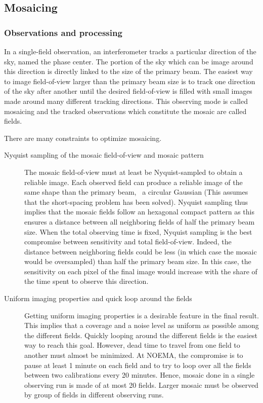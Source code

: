 \subsection{Mosaicing}
\label{sec:mosaicing}

\subsubsection{Observations and processing}

In a single-field observation, an interferometer tracks a particular
direction of the sky, named the phase center. The portion of the sky which
can be image around this direction is directly linked to the size of the
primary beam. The easiest way to image field-of-view larger than the
primary beam size is to track one direction of the sky after another until
the desired field-of-view is filled with small images made around many
different tracking directions. This observing mode is called mosaicing and
the tracked observations which constitute the mosaic are called fields.

There are many constraints to optimize mosaicing.
\begin{description}
\item[Nyquist sampling of the mosaic field-of-view and mosaic pattern] The
  mosaic field-of-view must at least be Nyquist-sampled to obtain a
  reliable image. Each observed field can produce a reliable image of the
  same shape than the primary beam, \ie\ a circular Gaussian (This assumes
  that the short-spacing problem has been solved). Nyquist sampling thus
  implies that the mosaic fields follow an hexagonal compact pattern as
  this ensures a distance between all neighboring fields of half the
  primary beam size. When the total observing time is fixed, Nyquist
  sampling is the best compromise between sensitivity and total
  field-of-view. Indeed, the distance between neighboring fields could be
  less (in which case the mosaic would be oversampled) than half the
  primary beam size. In this case, the sensitivity on each pixel of the
  final image would increase with the share of the time spent to observe
  this direction.
\item[Uniform imaging properties and quick loop around the fields] Getting
  uniform imaging properties is a desirable feature in the final result.
  This implies that a \uv{} coverage and a noise level as uniform as
  possible among the different fields. Quickly looping around the different
  fields is the easiest way to reach this goal. However, dead time to
  travel from one field to another must almost be minimized. At NOEMA,
  the compromise is to pause at least 1 minute on each field and to try to
  loop over all the fields between two calibrations every 20 minutes.
  Hence, mosaic done in a single observing run is made of at most 20
  fields.  Larger mosaic must be observed by group of fields in different
  observing runs.
\end{description}

